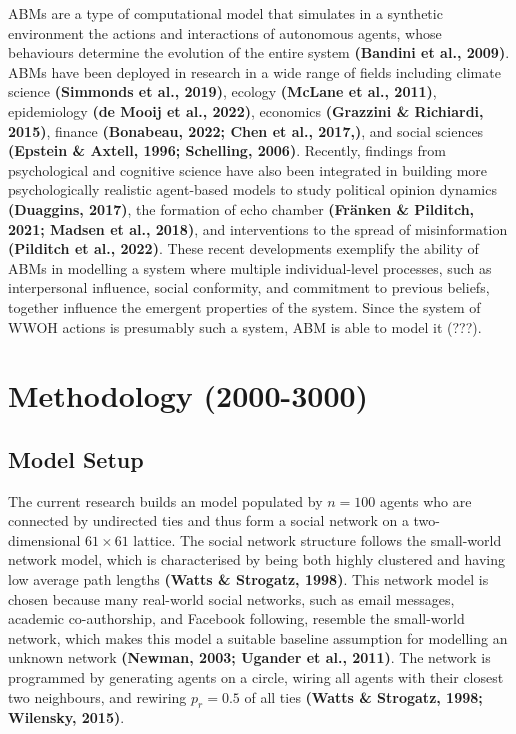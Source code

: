 \documentclass[
  11pt,
]{article}
\begin{document}
ABMs are a type of computational model that simulates in a synthetic
environment the actions and interactions of autonomous agents, whose
behaviours determine the evolution of the entire system \textbf{(Bandini
et al., 2009)}. ABMs have been deployed in research in a wide range of
fields including climate science \textbf{(Simmonds et al., 2019)},
ecology \textbf{(McLane et al., 2011)}, epidemiology \textbf{(de Mooij
et al., 2022)}, economics \textbf{(Grazzini \& Richiardi, 2015)},
finance \textbf{(Bonabeau, 2022; Chen et al., 2017,)}, and social
sciences \textbf{(Epstein \& Axtell, 1996; Schelling, 2006)}. Recently,
findings from psychological and cognitive science have also been
integrated in building more psychologically realistic agent-based models
to study political opinion dynamics \textbf{(Duaggins, 2017)}, the
formation of echo chamber \textbf{(Fränken \& Pilditch, 2021; Madsen et
al., 2018)}, and interventions to the spread of misinformation
\textbf{(Pilditch et al., 2022)}. These recent developments exemplify
the ability of ABMs in modelling a system where multiple
individual-level processes, such as interpersonal influence, social
conformity, and commitment to previous beliefs, together influence the
emergent properties of the system. Since the system of WWOH actions is
presumably such a system, ABM is able to model it (???).

\hypertarget{methodology-2000-3000}{%
\section{Methodology (2000-3000)}\label{methodology-2000-3000}}

\hypertarget{model-setup}{%
\subsection{Model Setup}\label{model-setup}}

The current research builds an model populated by \(n = 100\) agents who
are connected by undirected ties and thus form a social network on a
two-dimensional \(61 \times 61\) lattice. The social network structure
follows the small-world network model, which is characterised by being
both highly clustered and having low average path lengths \textbf{(Watts
\& Strogatz, 1998)}. This network model is chosen because many
real-world social networks, such as email messages, academic
co-authorship, and Facebook following, resemble the small-world network,
which makes this model a suitable baseline assumption for modelling an
unknown network \textbf{(Newman, 2003; Ugander et al., 2011)}. The
network is programmed by generating agents on a circle, wiring all
agents with their closest two neighbours, and rewiring \(p_r = 0.5\) of
all ties \textbf{(Watts \& Strogatz, 1998; Wilensky, 2015)}.
\end{document}
